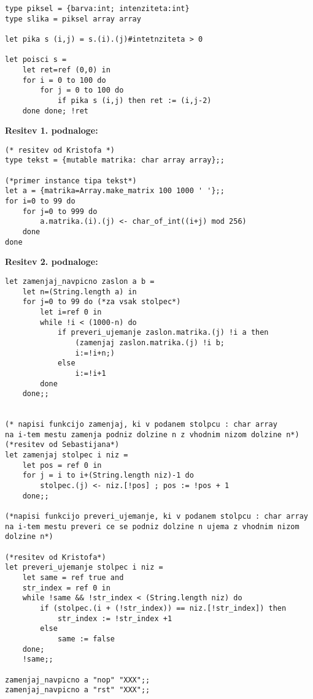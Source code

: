 \begin{Odgovor}{3.14}
\begin{lstlisting}
type piksel = {barva:int; intenziteta:int}
type slika = piksel array array

let pika s (i,j) = s.(i).(j)#intetnziteta > 0

let poisci s =
    let ret=ref (0,0) in
    for i = 0 to 100 do
        for j = 0 to 100 do
            if pika s (i,j) then ret := (i,j-2)
    done done; !ret
\end{lstlisting}
 
\end{Odgovor}
\begin{Odgovor}{3.15}

\textbf{Resitev 1. podnaloge:}
\begin{lstlisting}
(* resitev od Kristofa *)
type tekst = {mutable matrika: char array array};;

(*primer instance tipa tekst*)
let a = {matrika=Array.make_matrix 100 1000 ' '};;
for i=0 to 99 do
    for j=0 to 999 do
        a.matrika.(i).(j) <- char_of_int((i+j) mod 256)
    done
done
\end{lstlisting}

\textbf{Resitev 2. podnaloge:}
\begin{lstlisting}
let zamenjaj_navpicno zaslon a b =
    let n=(String.length a) in
    for j=0 to 99 do (*za vsak stolpec*)
        let i=ref 0 in
        while !i < (1000-n) do
            if preveri_ujemanje zaslon.matrika.(j) !i a then
                (zamenjaj zaslon.matrika.(j) !i b;
                i:=!i+n;)
            else
                i:=!i+1
        done
    done;;


(* napisi funkcijo zamenjaj, ki v podanem stolpcu : char array
na i-tem mestu zamenja podniz dolzine n z vhodnim nizom dolzine n*)
(*resitev od Sebastijana*)
let zamenjaj stolpec i niz =
    let pos = ref 0 in
    for j = i to i+(String.length niz)-1 do
        stolpec.(j) <- niz.[!pos] ; pos := !pos + 1
    done;;

(*napisi funkcijo preveri_ujemanje, ki v podanem stolpcu : char array
na i-tem mestu preveri ce se podniz dolzine n ujema z vhodnim nizom
dolzine n*)

(*resitev od Kristofa*)
let preveri_ujemanje stolpec i niz =
    let same = ref true and
    str_index = ref 0 in
    while !same && !str_index < (String.length niz) do
        if (stolpec.(i + (!str_index)) == niz.[!str_index]) then
            str_index := !str_index +1
        else
            same := false
    done;
    !same;;

zamenjaj_navpicno a "nop" "XXX";;
zamenjaj_navpicno a "rst" "XXX";;

\end{lstlisting}

\end{Odgovor}
